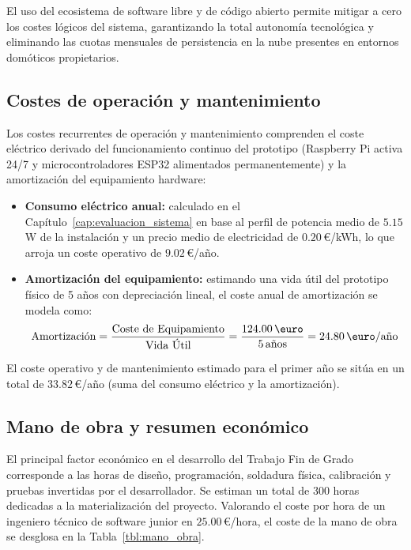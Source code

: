 El uso del ecosistema de software libre y de código abierto permite mitigar a cero los costes lógicos del sistema, garantizando la total autonomía tecnológica y eliminando las cuotas mensuales de persistencia en la nube presentes en entornos domóticos propietarios.

\subsection{Costes de operación y mantenimiento}
\label{sec:costes_operacion}
Los costes recurrentes de operación y mantenimiento comprenden el coste eléctrico derivado del funcionamiento continuo del prototipo (Raspberry Pi activa 24/7 y microcontroladores ESP32 alimentados permanentemente) y la amortización del equipamiento hardware:
\begin{itemize}
    \item \textbf{Consumo eléctrico anual:} calculado en el Capítulo~\ref{cap:evaluacion_sistema} en base al perfil de potencia medio de $5.15$\,W de la instalación y un precio medio de electricidad de $0.20$\,\euro/kWh, lo que arroja un coste operativo de $9.02$\,\euro/año.
    \item \textbf{Amortización del equipamiento:} estimando una vida útil del prototipo físico de 5 años con depreciación lineal, el coste anual de amortización se modela como:
    \begin{equation}
        \text{Amortización} = \frac{\text{Coste de Equipamiento}}{\text{Vida Útil}} = \frac{124.00\,\text{\euro}}{5\,\text{años}} = 24.80\,\text{\euro/año}
    \end{equation}
\end{itemize}
El coste operativo y de mantenimiento estimado para el primer año se sitúa en un total de $33.82$\,\euro/año (suma del consumo eléctrico y la amortización).

\subsection{Mano de obra y resumen económico}
\label{sec:mano_obra_resumen}
El principal factor económico en el desarrollo del Trabajo Fin de Grado corresponde a las horas de diseño, programación, soldadura física, calibración y pruebas invertidas por el desarrollador. Se estiman un total de 300 horas dedicadas a la materialización del proyecto. Valorando el coste por hora de un ingeniero técnico de software junior en $25.00$\,\euro/hora, el coste de la mano de obra se desglosa en la Tabla~\ref{tbl:mano_obra}.

